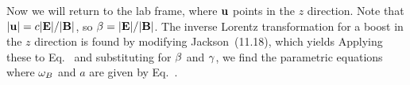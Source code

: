 {	Now we will return to the lab frame, where $\vb{u}$ points in the $z$ direction.  Note that $\abs{\vb{u}} = c \abs{\vb{E}} / \abs{\vb{B}}$, so $\beta = \abs{\vb{E}} / \abs{\vb{B}}$.  The inverse Lorentz transformation for a boost in the $z$ direction is found by modifying Jackson~(11.18), which yields
	Applying these to Eq.~ and substituting for $\beta$ and $\gamma$, we find the parametric equations
	{\color{blue} }%
	where $\omega_B$ and $a$ are given by Eq.~.
}

%
%


